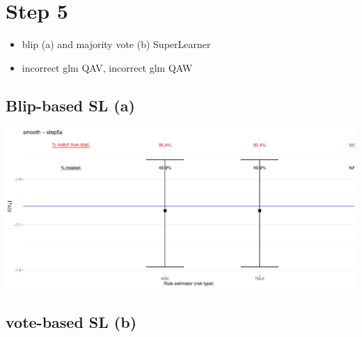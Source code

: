 \documentclass[11pt]{article}\usepackage[]{graphicx}\usepackage[]{color}
\makeatletter
\def\maxwidth{ %
  \ifdim\Gin@nat@width>\linewidth
    \linewidth
  \else
    \Gin@nat@width
  \fi
}
\makeatother
\begin{document}
\section{Step 5}

\begin{itemize}
\item blip (a) and majority vote (b) SuperLearner
\item incorrect glm QAV, incorrect glm QAW
\end{itemize}



\subsection{Blip-based SL (a)}

\includegraphics[width=\maxwidth]{figure/ODTR_DGP_smooth_step5a-1} 
\begin{table}[ht]
\centering
{}
\caption{smooth - step5a} 
\end{table}


\subsection{vote-based SL (b)}
\end{document}
